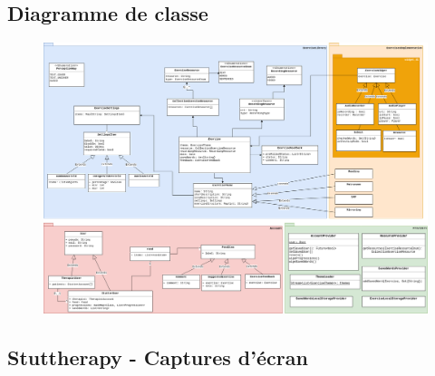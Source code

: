 \begin{appendices}
\begin{landscape}
  \chapter{Diagramme de classe}
  \label{appendix:class}
  \vspace{-40pt}
  \begin{figure}[H]
    \includegraphics[width=1\linewidth]{content/imgs/app_class_diagram.png}
  \end{figure}
\end{landscape}


\begin{landscape}
\chapter{Stuttherapy - Captures d'écran}
\label{appendix:screenshots}


\end{landscape}
\end{appendices}
